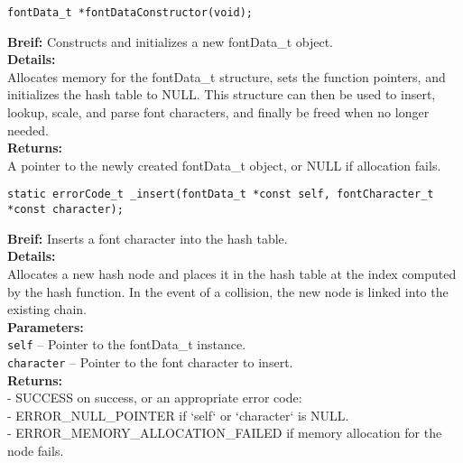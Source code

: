 
\begin{verbatim}
fontData_t *fontDataConstructor(void);
\end{verbatim}
\textbf{Breif:} Constructs and initializes a new fontData\_t object. \\
\textbf{Details:} \\
\hspace*{1cm}Allocates memory for the fontData\_t structure, sets the function pointers, and initializes the hash table to NULL. This structure can then be used to insert, lookup, scale, and parse font characters, and finally be freed when no longer needed. \\
\textbf{Returns:} \\
\hspace*{1cm}A pointer to the newly created fontData\_t object, or NULL if allocation fails. \\[1em]


\begin{verbatim}
static errorCode_t _insert(fontData_t *const self, fontCharacter_t *const character);
\end{verbatim}
\textbf{Breif:} Inserts a font character into the hash table. \\
\textbf{Details:} \\
\hspace*{1cm}Allocates a new hash node and places it in the hash table at the index computed by the hash function. In the event of a collision, the new node is linked into the existing chain. \\
\textbf{Parameters:} \\
\hspace*{1cm}\texttt{self} -- Pointer to the fontData\_t instance. \\
\hspace*{1cm}\texttt{character} -- Pointer to the font character to insert. \\
\textbf{Returns:} \\
\hspace*{1cm}- SUCCESS on success, or an appropriate error code: \\
\hspace*{1cm}- ERROR\_NULL\_POINTER if `self` or `character` is NULL. \\
\hspace*{1cm}- ERROR\_MEMORY\_ALLOCATION\_FAILED if memory allocation for the node fails. \\[1em]

